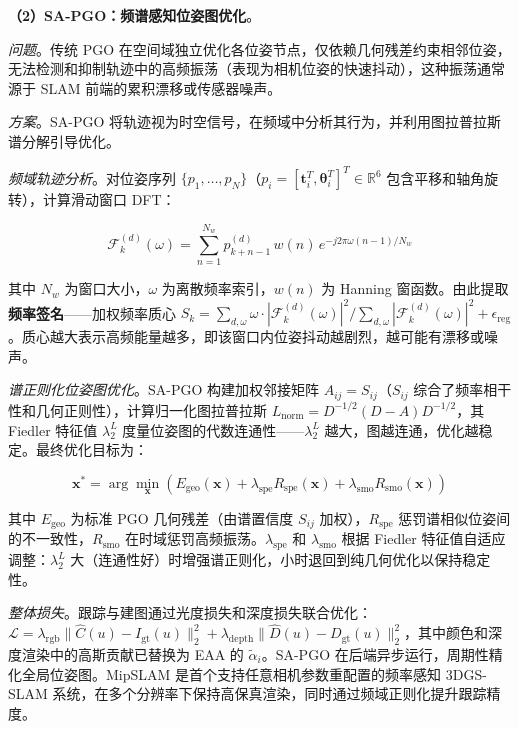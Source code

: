 \textbf{（2）SA-PGO：频谱感知位姿图优化}。

\textit{问题}。传统 PGO 在空间域独立优化各位姿节点，仅依赖几何残差约束相邻位姿，无法检测和抑制轨迹中的高频振荡（表现为相机位姿的快速抖动），这种振荡通常源于 SLAM 前端的累积漂移或传感器噪声。

\textit{方案}。SA-PGO 将轨迹视为时空信号，在频域中分析其行为，并利用图拉普拉斯谱分解引导优化。

\textit{频域轨迹分析}。对位姿序列 $\{p_1, \ldots, p_N\}$（$p_i = [\mathbf{t}_i^T, \boldsymbol{\theta}_i^T]^T \in \mathbb{R}^6$ 包含平移和轴角旋转），计算滑动窗口 DFT：

\begin{equation}
    \mathcal{F}_k^{(d)}(\omega) = \sum_{n=1}^{N_w} p_{k+n-1}^{(d)} \, w(n) \, e^{-j 2\pi \omega (n-1)/N_w}
\end{equation}

其中 $N_w$ 为窗口大小，$\omega$ 为离散频率索引，$w(n)$ 为 Hanning 窗函数。由此提取\textbf{频率签名}——加权频率质心 $S_k = \sum_{d,\omega} \omega \cdot |\mathcal{F}_k^{(d)}(\omega)|^2 / \sum_{d,\omega} |\mathcal{F}_k^{(d)}(\omega)|^2 + \epsilon_\text{reg}$。质心越大表示高频能量越多，即该窗口内位姿抖动越剧烈，越可能有漂移或噪声。

\textit{谱正则化位姿图优化}。SA-PGO 构建加权邻接矩阵 $A_{ij} = S_{ij}$（$S_{ij}$ 综合了频率相干性和几何正则性），计算归一化图拉普拉斯 $L_\text{norm} = D^{-1/2}(D - A)D^{-1/2}$，其 Fiedler 特征值 $\lambda_2^L$ 度量位姿图的代数连通性——$\lambda_2^L$ 越大，图越连通，优化越稳定。最终优化目标为：

\begin{equation}
    \mathbf{x}^* = \arg\min_{\mathbf{x}} \left(E_\text{geo}(\mathbf{x}) + \lambda_\text{spe} R_\text{spe}(\mathbf{x}) + \lambda_\text{smo} R_\text{smo}(\mathbf{x})\right)
\end{equation}

其中 $E_\text{geo}$ 为标准 PGO 几何残差（由谱置信度 $S_{ij}$ 加权），$R_\text{spe}$ 惩罚谱相似位姿间的不一致性，$R_\text{smo}$ 在时域惩罚高频振荡。$\lambda_\text{spe}$ 和 $\lambda_\text{smo}$ 根据 Fiedler 特征值自适应调整：$\lambda_2^L$ 大（连通性好）时增强谱正则化，小时退回到纯几何优化以保持稳定性。

\textit{整体损失}。跟踪与建图通过光度损失和深度损失联合优化：$\mathcal{L} = \lambda_\text{rgb}\|\hat{C}(u) - I_\text{gt}(u)\|_2^2 + \lambda_\text{depth}\|\hat{D}(u) - D_\text{gt}(u)\|_2^2$，其中颜色和深度渲染中的高斯贡献已替换为 EAA 的 $\tilde{\alpha}_i$。SA-PGO 在后端异步运行，周期性精化全局位姿图。MipSLAM 是首个支持任意相机参数重配置的频率感知 3DGS-SLAM 系统，在多个分辨率下保持高保真渲染，同时通过频域正则化提升跟踪精度。

